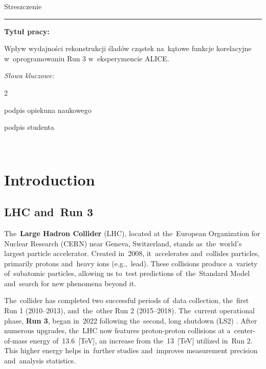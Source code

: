 \documentclass[11pt,a4paper,twoside]{book}
\numberwithin{equation}{chapter}
\newcommand{\thesistitlepl}{\begin{otherlanguage}{polish}
    Wpływ wydajności rekonstrukcji śladów cząstek na kątowe funkcje korelacyjne w oprogramowaniu Run 3 w eksperymencie ALICE.
\end{otherlanguage}}
\begin{document}
\newpage
{\Large Streszczenie}

{\color{plum}\rule[1pt]{\textwidth}{2pt}}

\textbf{Tytuł pracy:} \thesistitlepl

\vspace{0.025\textheight}
\textit{Słowa kluczowe:}\\
\textit{}

\vfill

\begin{multicols}{2}
    \begin{flushleft}
        podpis opiekuna naukowego
    \end{flushleft}
    \begin{flushright}
        podpis studenta
    \end{flushright}
\end{multicols}

\newpage
\mbox{ }

\tableofcontents
{}
\pagestyle{empty}


\chapter{Introduction}
\pagestyle{fancy}

\section{LHC and Run 3}

The \textbf{Large Hadron Collider} (LHC), located at the European Organization for Nuclear Research (CERN) near Geneva, Switzerland, stands as the world's largest particle accelerator. Created in 2008, it accelerates and collides particles, primarily protons and heavy ions (e.g., lead). These collisions produce a variety of subatomic particles, allowing us to test predictions of the Standard Model and search for new phenomena beyond it.

The collider has completed two successful periods of data collection, the first Run 1 (2010--2013), and the other Run 2 (2015--2018). The current operational phase, \textbf{Run 3}, began in 2022 following the second, long shutdown (LS2) \cite{lhc-upgrade}. After numerous upgrades, the LHC now features proton-proton collisions at a center-of-mass energy of 13.6 [TeV], an increase from the 13 [TeV] utilized in Run 2. This higher energy helps in further studies and improves measurement precision and analysis statistics.
\end{document}
